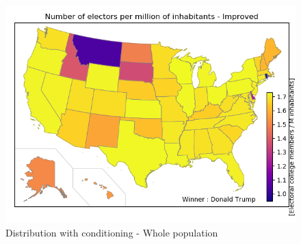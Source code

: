 \documentclass[a4paper,9pt,calibri,oneside,openany, twocolumn]{report}
\theoremstyle{break}
\begin{document}
\begin{figure}[H]
	\vspace*{0.5cm}
	\centering
	\includegraphics[width=\linewidth]{mapTotalImproved}
	\caption{Distribution with conditioning - Whole population}
\end{figure}
\end{document}
